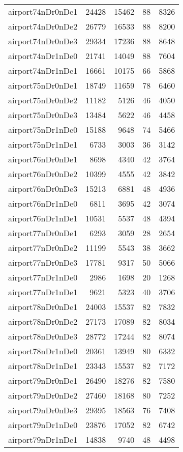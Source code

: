 \begin{longtable}{lrrrr}
airport74nDr0nDe1 & 24428 & 15462 & 88 & 8326 \\
airport74nDr0nDe2 & 26779 & 16533 & 88 & 8200 \\
airport74nDr0nDe3 & 29334 & 17236 & 88 & 8648 \\
airport74nDr1nDe0 & 21741 & 14049 & 88 & 7604 \\
airport74nDr1nDe1 & 16661 & 10175 & 66 & 5868 \\
airport75nDr0nDe1 & 18749 & 11659 & 78 & 6460 \\
airport75nDr0nDe2 & 11182 & 5126 & 46 & 4050 \\
airport75nDr0nDe3 & 13484 & 5622 & 46 & 4458 \\
airport75nDr1nDe0 & 15188 & 9648 & 74 & 5466 \\
airport75nDr1nDe1 & 6733 & 3003 & 36 & 3142 \\
airport76nDr0nDe1 & 8698 & 4340 & 42 & 3764 \\
airport76nDr0nDe2 & 10399 & 4555 & 42 & 3842 \\
airport76nDr0nDe3 & 15213 & 6881 & 48 & 4936 \\
airport76nDr1nDe0 & 6811 & 3695 & 42 & 3074 \\
airport76nDr1nDe1 & 10531 & 5537 & 48 & 4394 \\
airport77nDr0nDe1 & 6293 & 3059 & 28 & 2654 \\
airport77nDr0nDe2 & 11199 & 5543 & 38 & 3662 \\
airport77nDr0nDe3 & 17781 & 9317 & 50 & 5066 \\
airport77nDr1nDe0 & 2986 & 1698 & 20 & 1268 \\
airport77nDr1nDe1 & 9621 & 5323 & 40 & 3706 \\
airport78nDr0nDe1 & 24003 & 15537 & 82 & 7832 \\
airport78nDr0nDe2 & 27173 & 17089 & 82 & 8034 \\
airport78nDr0nDe3 & 28772 & 17244 & 82 & 8074 \\
airport78nDr1nDe0 & 20361 & 13949 & 80 & 6332 \\
airport78nDr1nDe1 & 23343 & 15537 & 82 & 7172 \\
airport79nDr0nDe1 & 26490 & 18276 & 82 & 7580 \\
airport79nDr0nDe2 & 27460 & 18168 & 80 & 7252 \\
airport79nDr0nDe3 & 29395 & 18563 & 76 & 7408 \\
airport79nDr1nDe0 & 23876 & 17052 & 82 & 6742 \\
airport79nDr1nDe1 & 14838 & 9740 & 48 & 4498 \\

\end{longtable}
